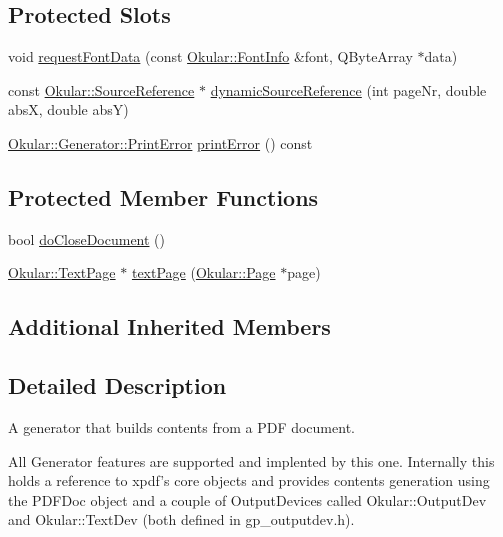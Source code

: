 \subsection*{Protected Slots}
\begin{DoxyCompactItemize}
\item 
void \hyperlink{classPDFGenerator_af22308428f7e0f951eb1a7e249d97418}{request\+Font\+Data} (const \hyperlink{classOkular_1_1FontInfo}{Okular\+::\+Font\+Info} \&font, Q\+Byte\+Array $\ast$data)
\item 
const \hyperlink{classOkular_1_1SourceReference}{Okular\+::\+Source\+Reference} $\ast$ \hyperlink{classPDFGenerator_a0ba0eeb79132d7fb790fc4c3dfa500aa}{dynamic\+Source\+Reference} (int page\+Nr, double abs\+X, double abs\+Y)
\item 
\hyperlink{classOkular_1_1Generator_a43266d4eb3e7929924dd10ea53bc1d61}{Okular\+::\+Generator\+::\+Print\+Error} \hyperlink{classPDFGenerator_a903f4c338b3f2a14ce331fc4a7a06cfb}{print\+Error} () const 
\end{DoxyCompactItemize}
\subsection*{Protected Member Functions}
\begin{DoxyCompactItemize}
\item 
bool \hyperlink{classPDFGenerator_a5cc94a6693aeaea5533e34430f537ba1}{do\+Close\+Document} ()
\item 
\hyperlink{classOkular_1_1TextPage}{Okular\+::\+Text\+Page} $\ast$ \hyperlink{classPDFGenerator_aefd3eeaad15f2a32add422650c04c801}{text\+Page} (\hyperlink{classOkular_1_1Page}{Okular\+::\+Page} $\ast$page)
\end{DoxyCompactItemize}
\subsection*{Additional Inherited Members}


\subsection{Detailed Description}
A generator that builds contents from a P\+D\+F document. 

All Generator features are supported and implented by this one. Internally this holds a reference to xpdf's core objects and provides contents generation using the P\+D\+F\+Doc object and a couple of Output\+Devices called Okular\+::\+Output\+Dev and Okular\+::\+Text\+Dev (both defined in gp\+\_\+outputdev.\+h).

